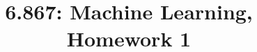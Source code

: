 \documentclass[preprint, 10pt]{sigplanconf}
\begin{document}
\title{6.867: Machine Learning, Homework 1}
\authorinfo{}
\maketitle





\end{document}
